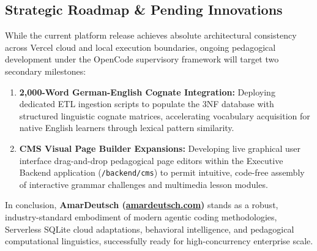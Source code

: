 \documentclass[12pt,a4paper]{article}
\begin{document}
\subsection{Strategic Roadmap \& Pending Innovations}
While the current platform release achieves absolute architectural consistency across Vercel cloud and local execution boundaries, ongoing pedagogical development under the OpenCode supervisory framework will target two secondary milestones:
\begin{enumerate}[label=\textbf{\arabic*.}]
    \item \textbf{2,000-Word German-English Cognate Integration:} Deploying dedicated ETL ingestion scripts to populate the 3NF database with structured linguistic cognate matrices, accelerating vocabulary acquisition for native English learners through lexical pattern similarity.
    \item \textbf{CMS Visual Page Builder Expansions:} Developing live graphical user interface drag-and-drop pedagogical page editors within the Executive Backend application (\texttt{/backend/cms}) to permit intuitive, code-free assembly of interactive grammar challenges and multimedia lesson modules.
\end{enumerate}

\vspace{0.5cm}
\noindent
In conclusion, \textbf{AmarDeutsch (\url{amardeutsch.com})} stands as a robust, industry-standard embodiment of modern agentic coding methodologies, Serverless SQLite cloud adaptations, behavioral intelligence, and pedagogical computational linguistics, successfully ready for high-concurrency enterprise scale.
\end{document}
